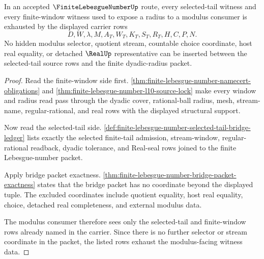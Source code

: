 \begin{theorem}
\label{thm:finite-lebesgue-number-selected-tail-modulus-exhaustion}
In an accepted $\FiniteLebesgueNumberUp$ route, every selected-tail witness and every finite-window witness used to expose a radius to a modulus consumer is exhausted by the displayed carrier rows
$$
D,W,\lambda,M,A_T,W_T,K_T,S_T,R_T,H,C,P,N .
$$
No hidden modulus selector, quotient stream, countable choice coordinate, host real equality, or detached $\RealUp$ representative can be inserted between the selected-tail source rows and the finite dyadic-radius packet.
\end{theorem}
\begin{proof}
Read the finite-window side first. \autoref{thm:finite-lebesgue-number-namecert-obligations} and \autoref{thm:finite-lebesgue-number-l10-source-lock} make every window and radius read pass through the dyadic cover, rational-ball radius, mesh, stream-name, regular-rational, and real rows with the displayed structural support.

Now read the selected-tail side. \autoref{def:finite-lebesgue-number-selected-tail-bridge-ledger} lists exactly the selected finite-tail admission, stream-window, regular-rational readback, dyadic tolerance, and Real-seal rows joined to the finite Lebesgue-number packet.

Apply bridge packet exactness. \autoref{thm:finite-lebesgue-number-bridge-packet-exactness} states that the bridge packet has no coordinate beyond the displayed tuple. The excluded coordinates include quotient equality, host real equality, choice, detached real completeness, and external modulus data.

The modulus consumer therefore sees only the selected-tail and finite-window rows already named in the carrier. Since there is no further selector or stream coordinate in the packet, the listed rows exhaust the modulus-facing witness data.
\end{proof}

